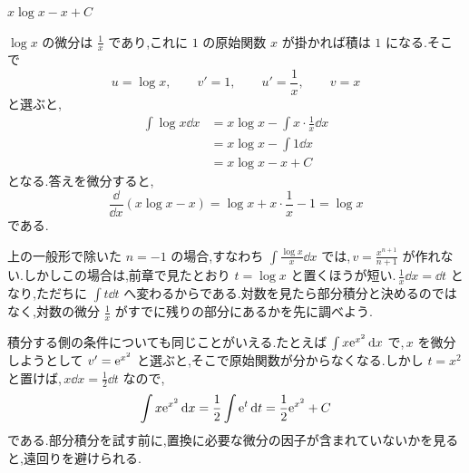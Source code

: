 $x\log x-x+C$

$\log x$ の微分は $\frac1x$ であり,これに $1$ の原始関数 $x$ が掛かれば積は $1$ になる.そこで
\[
 u=\log x,\qquad v'=1,
 \qquad u'=\frac1x,\qquad v=x
\]
と選ぶと,
\[
\begin{aligned}
 \int\log x\dd x
 &=x\log x-\int x\cdot\frac1x\dd x\\
 &=x\log x-\int 1\dd x\\
 &=x\log x-x+C
\end{aligned}
\]
となる.答えを微分すると,
\[
 \frac{\dd}{\dd x}(x\log x-x)
 =\log x+x\cdot\frac1x-1
 =\log x
\]
である.

上の一般形で除いた $n=-1$ の場合,すなわち $\int\frac{\log x}{x}\dd x$ では,\,$v=\frac{x^{n+1}}{n+1}$ が作れない.しかしこの場合は,前章で見たとおり $t=\log x$ と置くほうが短い.\,$\frac1x\dd x=\dd t$ となり,ただちに $\int t\dd t$ へ変わるからである.対数を見たら部分積分と決めるのではなく,対数の微分 $\frac1x$ がすでに残りの部分にあるかを先に調べよう.

積分する側の条件についても同じことがいえる.たとえば $\int x\mathrm{e}^{x^2}\,\mathrm{d} x$ で,\,$x$ を微分しようとして $v'=\mathrm{e}^{x^2}$ と選ぶと,そこで原始関数が分からなくなる.しかし $t=x^2$ と置けば,\,$x\dd x=\frac12\dd t$ なので,
\[
 \int x\mathrm{e}^{x^2}\,\mathrm{d} x
 =\frac12\int\mathrm{e}^t\,\mathrm{d} t
 =\frac12\mathrm{e}^{x^2}+C
\]
である.部分積分を試す前に,置換に必要な微分の因子が含まれていないかを見ると,遠回りを避けられる.
